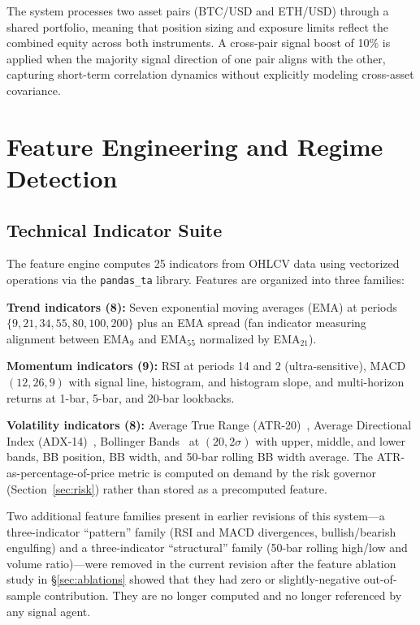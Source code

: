 \documentclass{article}
\begin{document}
The system processes two asset pairs (BTC/USD and ETH/USD) through a shared portfolio, meaning that position sizing and exposure limits reflect the combined equity across both instruments.
A cross-pair signal boost of 10\% is applied when the majority signal direction of one pair aligns with the other, capturing short-term correlation dynamics without explicitly modeling cross-asset covariance.

\section{Feature Engineering and Regime Detection}
\label{sec:features}

\subsection{Technical Indicator Suite}

The feature engine computes 25 indicators from OHLCV data using vectorized operations via the \texttt{pandas\_ta} library.
Features are organized into three families:

\textbf{Trend indicators (8):} Seven exponential moving averages (EMA) at periods $\{9, 21, 34, 55, 80, 100, 200\}$ plus an EMA spread (fan indicator measuring alignment between EMA$_9$ and EMA$_{55}$ normalized by EMA$_{21}$).

\textbf{Momentum indicators (9):} RSI at periods 14 and 2 (ultra-sensitive), MACD$(12, 26, 9)$ with signal line, histogram, and histogram slope, and multi-horizon returns at 1-bar, 5-bar, and 20-bar lookbacks.

\textbf{Volatility indicators (8):} Average True Range (ATR-20)~\citep{Wilder1978}, Average Directional Index (ADX-14)~\citep{Wilder1978}, Bollinger Bands~\citep{bollinger2001bollinger} at $(20, 2\sigma)$ with upper, middle, and lower bands, BB position, BB width, and 50-bar rolling BB width average. The ATR-as-percentage-of-price metric is computed on demand by the risk governor (Section~\ref{sec:risk}) rather than stored as a precomputed feature.

Two additional feature families present in earlier revisions of this system---a three-indicator ``pattern'' family (RSI and MACD divergences, bullish/bearish engulfing) and a three-indicator ``structural'' family (50-bar rolling high/low and volume ratio)---were removed in the current revision after the feature ablation study in \S\ref{sec:ablations} showed that they had zero or slightly-negative out-of-sample contribution. They are no longer computed and no longer referenced by any signal agent.
\end{document}
